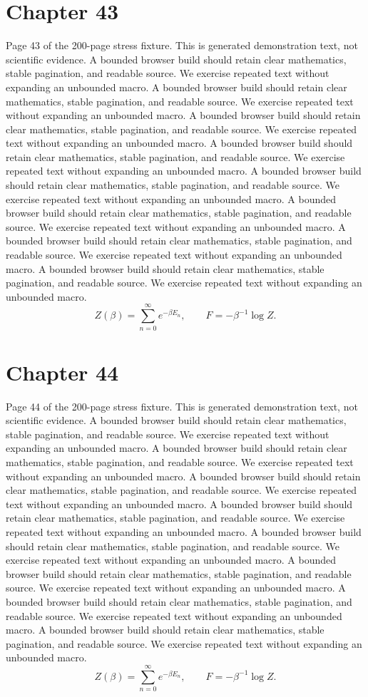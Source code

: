 \documentclass[11pt]{article}
\begin{document}
\section*{Chapter 43}
Page 43 of the 200-page stress fixture. This is generated demonstration text, not scientific evidence.
A bounded browser build should retain clear mathematics, stable pagination, and readable source. We exercise repeated text without expanding an unbounded macro.
A bounded browser build should retain clear mathematics, stable pagination, and readable source. We exercise repeated text without expanding an unbounded macro.
A bounded browser build should retain clear mathematics, stable pagination, and readable source. We exercise repeated text without expanding an unbounded macro.
A bounded browser build should retain clear mathematics, stable pagination, and readable source. We exercise repeated text without expanding an unbounded macro.
A bounded browser build should retain clear mathematics, stable pagination, and readable source. We exercise repeated text without expanding an unbounded macro.
A bounded browser build should retain clear mathematics, stable pagination, and readable source. We exercise repeated text without expanding an unbounded macro.
A bounded browser build should retain clear mathematics, stable pagination, and readable source. We exercise repeated text without expanding an unbounded macro.
A bounded browser build should retain clear mathematics, stable pagination, and readable source. We exercise repeated text without expanding an unbounded macro.
\[Z(\beta)=\sum_{n=0}^{\infty}e^{-\beta E_n},\qquad F=-\beta^{-1}\log Z.\]
\newpage
\section*{Chapter 44}
Page 44 of the 200-page stress fixture. This is generated demonstration text, not scientific evidence.
A bounded browser build should retain clear mathematics, stable pagination, and readable source. We exercise repeated text without expanding an unbounded macro.
A bounded browser build should retain clear mathematics, stable pagination, and readable source. We exercise repeated text without expanding an unbounded macro.
A bounded browser build should retain clear mathematics, stable pagination, and readable source. We exercise repeated text without expanding an unbounded macro.
A bounded browser build should retain clear mathematics, stable pagination, and readable source. We exercise repeated text without expanding an unbounded macro.
A bounded browser build should retain clear mathematics, stable pagination, and readable source. We exercise repeated text without expanding an unbounded macro.
A bounded browser build should retain clear mathematics, stable pagination, and readable source. We exercise repeated text without expanding an unbounded macro.
A bounded browser build should retain clear mathematics, stable pagination, and readable source. We exercise repeated text without expanding an unbounded macro.
A bounded browser build should retain clear mathematics, stable pagination, and readable source. We exercise repeated text without expanding an unbounded macro.
\[Z(\beta)=\sum_{n=0}^{\infty}e^{-\beta E_n},\qquad F=-\beta^{-1}\log Z.\]
\newpage
\end{document}
